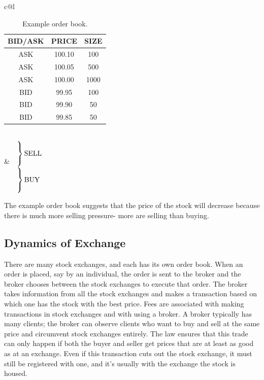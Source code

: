\begin{table}[h]
\centering
\noindent\begin{tabular}{c@{}l}
  \begin{tabular}{c|c|c}
  	BID/ASK & PRICE & SIZE \\
    \hline
    ASK & 100.10 & 100 \\
	ASK & 100.05 & 500 \\
	ASK & 100.00 & 1000 \\
	BID & 99.95 & 100 \\
	BID & 99.90 & 50 \\
	BID & 99.85 & 50 \\
  \end{tabular} 
  & 
  $\begin{array}{l}
  \\
    \MyLBrace{5ex}{SELL} \\ 
    \MyLBrace{5ex}{BUY} \\ 
  \end{array}$
\end{tabular}
\caption{Example order book.}
\end{table}

The example order book suggests that the price of the stock will decrease because there is much more selling pressure- more are selling than buying. \\

\subsection{Dynamics of Exchange}
There are many stock exchanges, and each has its own order book. When an order is placed, say by an individual, the order is sent to the broker and the broker chooses between the stock exchanges to execute that order. The broker takes information from all the stock exchanges and makes a transaction based on which one has the stock with the best price. Fees are associated with making transactions in stock exchanges and with using a broker. A broker typically has many clients; the broker can observe clients who want to buy and sell at the same price and circumvent stock exchanges entirely. The law ensures that this trade can only happen if both the buyer and seller get prices that are at least as good as at an exchange. Even if this transaction cuts out the stock exchange, it must still be registered with one, and it's usually with the exchange the stock is housed. \\

